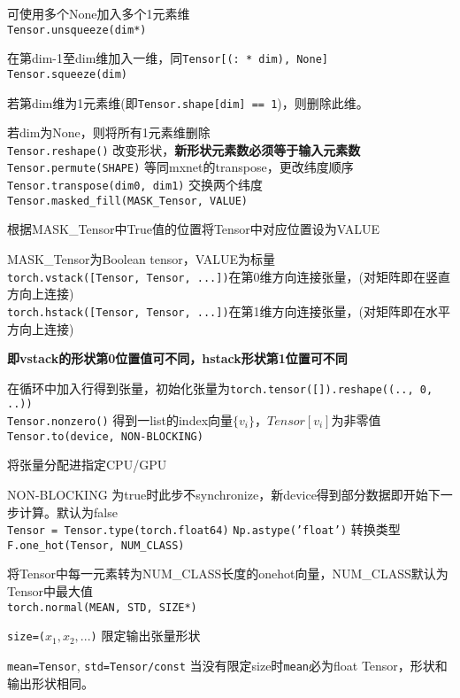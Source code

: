 \documentclass[UTF8]{ctexart}
\begin{document}
  可使用多个None加入多个1元素维\\
\texttt{Tensor.unsqueeze(dim*)}

  在第dim-1至dim维加入一维，同\texttt{Tensor[(: * dim), None]}\\
\texttt{Tensor.squeeze(dim)}

  若第dim维为1元素维(即\texttt{Tensor.shape[dim] == 1})，则删除此维。

  若dim为None，则将所有1元素维删除\\
\texttt{Tensor.reshape()} 改变形状，\textbf{新形状元素数必须等于输入元素数}\\
\texttt{Tensor.permute(SHAPE)} 等同mxnet的transpose，更改纬度顺序\\
\texttt{Tensor.transpose(dim0, dim1)} 交换两个纬度\\
\texttt{Tensor.masked\_fill(MASK\_Tensor, VALUE)}

  根据MASK\_Tensor中True值的位置将Tensor中对应位置设为VALUE

  MASK\_Tensor为Boolean tensor，VALUE为标量\\
\texttt{torch.vstack([Tensor, Tensor, ...])}在第0维方向连接张量，(对矩阵即在竖直方向上连接)\\
\texttt{torch.hstack([Tensor, Tensor, ...])}在第1维方向连接张量，(对矩阵即在水平方向上连接)

  \textbf{即vstack的形状第0位置值可不同，hstack形状第1位置可不同}

  在循环中加入行得到张量，初始化张量为\texttt{torch.tensor([]).reshape((.., 0, ..))}\\
\texttt{Tensor.nonzero()} 得到一list的index向量$\{v_i\}$，$Tensor[v_i]$为非零值\\
\texttt{Tensor.to(device, NON-BLOCKING)} 

  将张量分配进指定CPU/GPU
  
  NON-BLOCKING 为true时此步不synchronize，新device得到部分数据即开始下一步计算。默认为false\\
\texttt{Tensor = Tensor.type(torch.float64)} \texttt{Np.astype('float')} 转换类型\\
\texttt{F.one\_hot(Tensor, NUM\_CLASS)} 

  将Tensor中每一元素转为NUM\_CLASS长度的onehot向量，NUM\_CLASS默认为Tensor中最大值\\
\texttt{torch.normal(MEAN, STD, SIZE*)}

  \texttt{size=($x_1, x_2, ...$)} 限定输出张量形状

  \texttt{mean=Tensor}, \texttt{std=Tensor/const} 当没有限定size时\texttt{mean}必为float Tensor，形状和输出形状相同。
\end{document}
